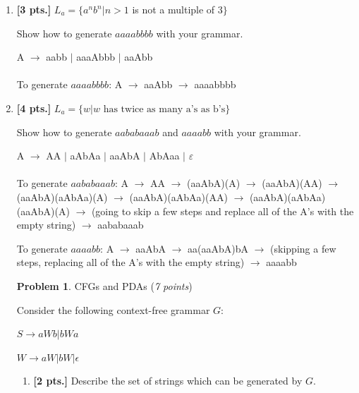 \documentclass[11pt]{article}
\theoremstyle{definition}
\theoremstyle{theorem}
\newtheorem{prob}{Problem}
\newcommand{\solution}{\medskip\noindent{\color{blue}\textbf{Solution:}}}
\begin{document}
\begin{enumerate}[label=(\alph*)]

\item \textbf{[3 pts.]}  $L_a = \{a^nb^n | n > 1$ is not a multiple of 3$\}$

Show how to generate $aaaabbbb$ with your grammar.

\solution

A $\rightarrow$ aabb $|$ aaaAbbb $|$ aaAbb  \\~\\

To generate $aaaabbbb$: A $\rightarrow$ aaAbb $\rightarrow$ aaaabbbb

\item \textbf{[4 pts.]}  $L_a = \{w | w \text{~has twice as many a's as b's}\}$

Show how to generate $aababaaab$ and $aaaabb$ with your grammar.

\solution

A $\rightarrow$ AA $|$ aAbAa $|$ aaAbA $|$ AbAaa $|$ $\varepsilon$ \\~\\

To generate $aababaaab$: A $\rightarrow$ AA $\rightarrow$ (aaAbA)(A) $\rightarrow$ (aaAbA)(AA) $\rightarrow$ (aaAbA)(aAbAa)(A) $\rightarrow$ (aaAbA)(aAbAa)(AA) $\rightarrow$ (aaAbA)(aAbAa)(aaAbA)(A) $\rightarrow$ (going to skip a few steps and replace all of the A's with the empty string) $\rightarrow$
aababaaab

To generate $aaaabb$: A $\rightarrow$ aaAbA $\rightarrow$ aa(aaAbA)bA $\rightarrow$ (skipping a few steps, replacing all of the A's with the empty string)
$\rightarrow$ aaaabb







\newpage

\begin{prob} CFGs and PDAs (\emph{7 points})\end{prob}

Consider the following context-free grammar $G$:

$S \rightarrow aWb | bWa$

$W \rightarrow aW | bW | \epsilon$

\begin{enumerate}[label=(\alph*)]

\item \textbf{[2 pts.]} Describe the set of strings which can be generated by $G$.


\end{enumerate}
\end{enumerate}
\end{document}
